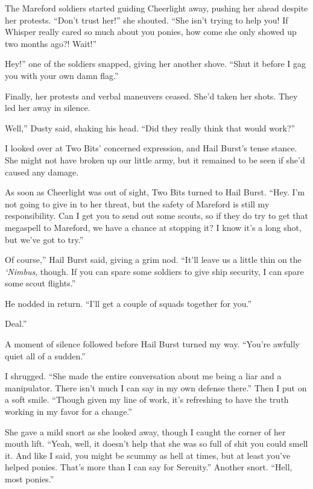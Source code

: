 The Mareford soldiers started guiding Cheerlight away, pushing her ahead despite her protests. “Don’t trust her!” she shouted. “She isn’t trying to help you! If Whisper really cared so much about you ponies, how come she only showed up two months ago?! Wait!”

\leavevmode{}Hey!” one of the soldiers snapped, giving her another shove. “Shut it before I gag you with your own damn flag.”

Finally, her protests and verbal maneuvers ceased. She’d taken her shots. They led her away in silence.

\leavevmode{}Well,” Dusty said, shaking his head. “Did they really think that would work?”

I looked over at Two Bits’ concerned expression, and Hail Burst’s tense stance. She might not have broken up our little army, but it remained to be seen if she’d caused any damage.

As soon as Cheerlight was out of sight, Two Bits turned to Hail Burst. “Hey. I’m not going to give in to her threat, but the safety of Mareford is still my responsibility. Can I get you to send out some scouts, so if they do try to get that megaspell to Mareford, we have a chance at stopping it? I know it’s a long shot, but we’ve got to try.”

\leavevmode{}Of course,” Hail Burst said, giving a grim nod. “It’ll leave us a little thin on the \textit{‘Nimbus}, though. If you can spare some soldiers to give ship security, I can spare some scout flights.”

He nodded in return. “I’ll get a couple of squads together for you.”

\leavevmode{}Deal.”

A moment of silence followed before Hail Burst turned my way. “You’re awfully quiet all of a sudden.”

I shrugged. “She made the entire conversation about me being a liar and a manipulator. There isn’t much I can say in my own defense there.” Then I put on a soft smile. “Though given my line of work, it’s refreshing to have the truth working in my favor for a change.”

She gave a mild snort as she looked away, though I caught the corner of her mouth lift. “Yeah, well, it doesn’t help that she was so full of shit you could smell it. And like I said, you might be scummy as hell at times, but at least you’ve helped ponies. That’s more than I can say for Serenity.” Another snort. “Hell, most ponies.”


